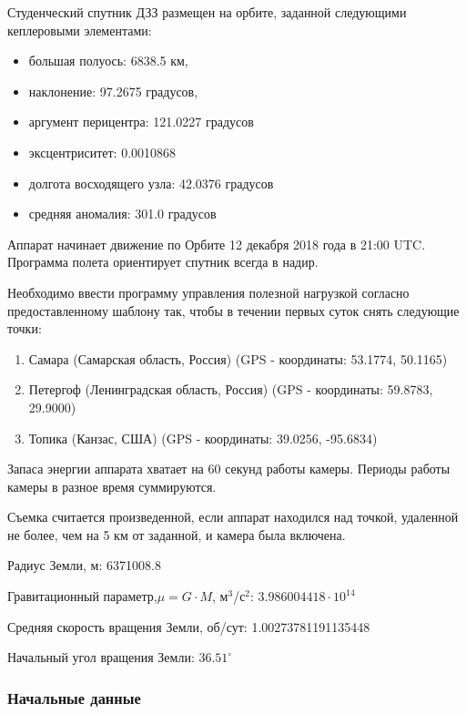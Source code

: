 
Студенческий спутник ДЗЗ размещен на орбите, заданной следующими кеплеровыми элементами:

\begin{itemize}
    \item большая полуось: 6838.5 км,
    \item наклонение: 97.2675 градусов,
    \item аргумент перицентра:  121.0227 градусов
    \item эксцентриситет:  0.0010868
    \item долгота восходящего узла:  42.0376 градусов
    \item средняя аномалия: 301.0 градусов
\end{itemize}

Аппарат начинает движение по Орбите 12 декабря 2018 года в 21:00 UTC. 
Программа полета ориентирует спутник всегда в надир.

Необходимо ввести программу управления полезной нагрузкой согласно предоставленному шаблону так, 
чтобы в течении первых суток снять следующие точки:

\begin{enumerate}
    \item Самара (Самарская область, Россия) (GPS - координаты: 53.1774, 50.1165)
    \item Петергоф (Ленинградская область, Россия) (GPS - координаты: 59.8783, 29.9000)
    \item Топика (Канзас, США)  (GPS - координаты: 39.0256, -95.6834)
\end{enumerate}

Запаса энергии аппарата хватает на 60 секунд работы камеры. Периоды работы камеры в разное время суммируются.

Съемка считается произведенной, если аппарат находился над точкой, удаленной не более, чем на 5 км от заданной, 
и камера была включена.

Радиус Земли, м: 6371008.8

Гравитационный параметр,$ \mu = G \cdot M$, м$^3$/с$^2$: $3.986004418 \cdot 10^{14}$

Средняя скорость вращения Земли, об/сут: 1.00273781191135448

Начальный угол вращения Земли: $36.51^{\circ}$

\subsubsection*{Начальные данные}

